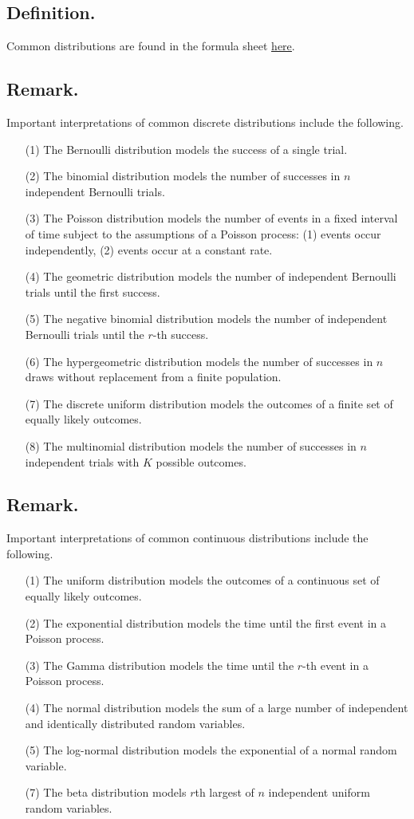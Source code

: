 \documentclass[titlepage]{article}
\begin{document}
\subsection{Definition.} Common distributions are found in the formula sheet \href{https://github.com/dyao13/EN_553_420_SP24/blob/main/420distribution_table.pdf}{\underline{here}}.

\subsection{Remark.} Important interpretations of common discrete distributions include the following.
\begin{enumerate}
\item[(1)] The Bernoulli distribution models the success of a single trial.
\item[(2)] The binomial distribution models the number of successes in $n$ independent Bernoulli trials.
\item[(3)] The Poisson distribution models the number of events in a fixed interval of time subject to the assumptions of a Poisson process: (1) events occur independently, (2) events occur at a constant rate.
\item[(4)] The geometric distribution models the number of independent Bernoulli trials until the first success.
\item[(5)] The negative binomial distribution models the number of independent Bernoulli trials until the $r$-th success.
\item[(6)] The hypergeometric distribution models the number of successes in $n$ draws without replacement from a finite population.
\item[(7)] The discrete uniform distribution models the outcomes of a finite set of equally likely outcomes.
\item[(8)] The multinomial distribution models the number of successes in $n$ independent trials with $K$ possible outcomes.
\end{enumerate}

\subsection{Remark.} Important interpretations of common continuous distributions include the following.
\begin{enumerate}
\item[(1)] The uniform distribution models the outcomes of a continuous set of equally likely outcomes.
\item[(2)] The exponential distribution models the time until the first event in a Poisson process.
\item[(3)] The Gamma distribution models the time until the $r$-th event in a Poisson process.
\item[(4)] The normal distribution models the sum of a large number of independent and identically distributed random variables.
\item[(5)] The log-normal distribution models the exponential of a normal random variable.
\item[(7)] The beta distribution models $r$th largest of $n$ independent uniform random variables.
\end{enumerate}
\end{document}
